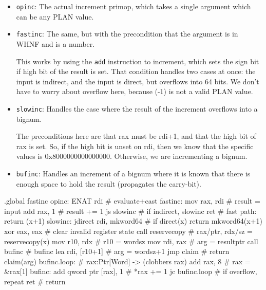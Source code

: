 \begin{itemize}
\item
  \lstinline|opinc|: The actual increment primop, which takes a single
  argument which can be any PLAN value.

\item
  \lstinline|fastinc|: The same, but with the precondition that the
  argument is in WHNF and is a number.

  This works by using the \lstinline|add| instruction to increment, which
  sets the sign bit if high bit of the result is set.  That condition
  handles two cases at once: the input is indirect, and the input is
  direct, but overflows into 64 bits.  We don't have to worry about
  overflow here, because (-1) is not a valid PLAN value.

\item
  \lstinline|slowinc|: Handles the case where the result of the increment
  overflows into a bignum.

  The preconditions here are that rax must be rdi+1, and that the high
  bit of rax is set.  So, if the high bit is unset on rdi, then we know
  that the specific values is 0x8000000000000000.  Otherwise, we are
  incrementing a bignum.

\item
  \lstinline|bufinc|: Handles an increment of a bignum where it is
  known that there is enough space to hold the result (propagates the
  carry-bit).

\end{itemize}
\begin{asm}
.global fastinc
opinc:
	ENAT	rdi                         # evaluate+cast
fastinc:
	mov	rax, rdi                    # result = input
	add	rax, 1                      # result += 1
	js	slowinc                     # if indirect, slowinc
	ret                                 # fast path: return (x+1)
slowinc:
	jdirect	rdi, mkword64               # if direct(x) return mkword64(x+1)
	xor	eax, eax                    # clear invalid register state
	call	reservecopy                 # rax/ptr, rdx/sz = reservecopy(x)
	mov	r10, rdx                    # r10 = wordsz
	mov	rdi, rax                    # arg = resultptr
	call	bufinc                      # bufinc
	lea	rdi, [r10+1]                # arg = wordsz+1
	jmp	claim                       # return claim(arg)
bufinc.loop:                                # rax:Ptr[Word] -> (clobbers rax)
	add	rax, 8                      # rax = &rax[1]
bufinc:
	add	qword ptr [rax], 1          # *rax += 1
	jc	bufinc.loop                 # if overflow, repeat
	ret                                 # return
\end{asm}

